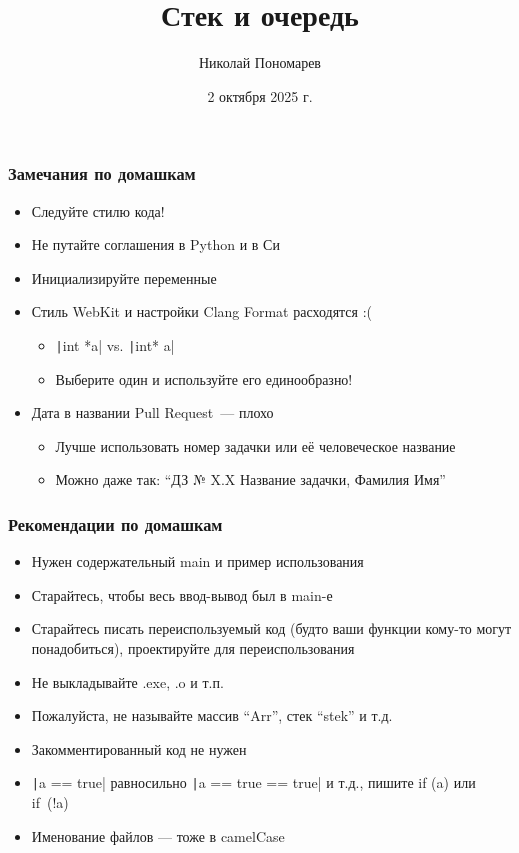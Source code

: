 \documentclass[aspectratio=169]{beamer}
\title{Стек и очередь}
\author{Николай Пономарев}
\date{2 октября 2025 г.}
\begin{document}
\begin{frame}
    \titlepage
\end{frame}

\begin{frame}[fragile]
    \frametitle{Замечания по домашкам}

    \begin{itemize}
        \item Следуйте стилю кода!
        \item Не путайте соглашения в Python и в Си
        \item Инициализируйте переменные
        \item Стиль WebKit и настройки Clang Format расходятся :(
              \begin{itemize}
                  \item \texttt|int *a| vs. \texttt|int* a|
                  \item Выберите один и используйте его единообразно!
              \end{itemize}
        \item Дата в названии Pull Request~--- плохо
              \begin{itemize}
                  \item Лучше использовать номер задачки или её человеческое название
                  \item Можно даже так: \enquote{ДЗ № X.X Название задачки, Фамилия Имя}
              \end{itemize}
    \end{itemize}

\end{frame}

\begin{frame}[fragile]
    \frametitle{Рекомендации по домашкам}
    \begin{itemize}
        \item Нужен содержательный main и пример использования
        \item Старайтесь, чтобы весь ввод-вывод был в main-е
        \item Старайтесь писать переиспользуемый код (будто ваши функции кому-то могут понадобиться), проектируйте для переиспользования
        \item Не выкладывайте .exe, .o и т.п.
        \item Пожалуйста, не называйте массив \enquote{Arr}, стек \enquote{stek} и т.д.
        \item Закомментированный код не нужен
        \item \texttt|a == true| равносильно \texttt|a == true == true| и т.д., пишите if (a) или if~(!a)
        \item Именование файлов --- тоже в camelCase
    \end{itemize}
\end{frame}
\end{document}
